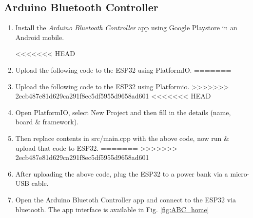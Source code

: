 \documentclass[conference]{IEEEtran}
\begin{document}
\subsection{Arduino Bluetooth Controller}
\begin{enumerate}

\item Install the {\em Arduino Bluetooth Controller} app using Google Playstore in an Android mobile.

<<<<<<< HEAD
\item Upload the following code to the ESP32 using PlatformIO.
=======
\item Upload the following code to the ESP32 using Platformio.
>>>>>>> 2ecb487e81d629ca291f8ec5df5955d9658ad601
<<<<<<< HEAD
\item Open PlatformIO, select New Project and then fill in the details (name, board \& framework).
\item Then replace contents in src/main.cpp with the above code, now run \& upload that code to ESP32.
=======
>>>>>>> 2ecb487e81d629ca291f8ec5df5955d9658ad601
\item After uploading the above code, plug the ESP32 to a power bank via a micro-USB cable.
\item Open the Arduino Bluetoth Controller app and connect to the ESP32 via bluetooth. The app interface is available in Fig. \ref{fig:ABC_home}
\begin{figure}[!h]
\centering
\resizebox{\columnwidth}{!}{%
}
\end{figure}
\end{enumerate}
\end{document}

